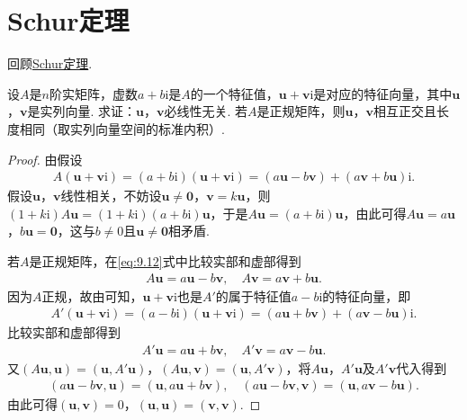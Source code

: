 \documentclass[../../main.tex]{subfiles}%
\begin{document}
\section{Schur定理}

回顾\hyperref[theorem:Schur(舒尔)定理]{Schur定理}.

\begin{proposition}\label{proposition:两个半正定阵可同时合同对角化6}
设\(A\)是\(n\)阶实矩阵，虚数\(a + b\mathrm{i}\)是\(A\)的一个特征值，\(\boldsymbol{u}+ \boldsymbol{v}\mathrm{i}\)是对应的特征向量，其中\(\boldsymbol{u}\)，\(\boldsymbol{v}\)是实列向量. 求证：\(\boldsymbol{u}\)，\(\boldsymbol{v}\)必线性无关. 若\(A\)是正规矩阵，则\(\boldsymbol{u}\)，\(\boldsymbol{v}\)相互正交且长度相同（取实列向量空间的标准内积）.
\end{proposition}
\begin{proof}
由假设
\begin{align}
A(\boldsymbol{u}+ \boldsymbol{v}\mathrm{i})=(a + b\mathrm{i})(\boldsymbol{u}+ \boldsymbol{v}\mathrm{i})=(a\boldsymbol{u}-b\boldsymbol{v})+(a\boldsymbol{v}+b\boldsymbol{u})\mathrm{i}.\label{eq:9.12}
\end{align}
假设\(\boldsymbol{u}\)，\(\boldsymbol{v}\)线性相关，不妨设\(\boldsymbol{u}\neq\boldsymbol{0}\)，\(\boldsymbol{v}=k\boldsymbol{u}\)，则\((1 + k\mathrm{i})A\boldsymbol{u}=(1 + k\mathrm{i})(a + b\mathrm{i})\boldsymbol{u}\)，于是\(A\boldsymbol{u}=(a + b\mathrm{i})\boldsymbol{u}\)，由此可得\(A\boldsymbol{u}=a\boldsymbol{u}\)，\(b\boldsymbol{u}=\boldsymbol{0}\)，这与\(b\neq0\)且\(\boldsymbol{u}\neq\boldsymbol{0}\)相矛盾.

若\(A\)是正规矩阵，在\eqref{eq:9.12}式中比较实部和虚部得到
\begin{align*}
A\boldsymbol{u}=a\boldsymbol{u}-b\boldsymbol{v},\quad A\boldsymbol{v}=a\boldsymbol{v}+b\boldsymbol{u}.
\end{align*}
因为\(A\)正规，故由可知，\(\boldsymbol{u}+ \boldsymbol{v}\mathrm{i}\)也是\(A'\)的属于特征值\(a - b\mathrm{i}\)的特征向量，即
\begin{align*}
A'(\boldsymbol{u}+ \boldsymbol{v}\mathrm{i})=(a - b\mathrm{i})(\boldsymbol{u}+ \boldsymbol{v}\mathrm{i})=(a\boldsymbol{u}+b\boldsymbol{v})+(a\boldsymbol{v}-b\boldsymbol{u})\mathrm{i}.
\end{align*}
比较实部和虚部得到
\begin{align*}
A'\boldsymbol{u}=a\boldsymbol{u}+b\boldsymbol{v},\quad A'\boldsymbol{v}=a\boldsymbol{v}-b\boldsymbol{u}.
\end{align*}
又\((A\boldsymbol{u},\boldsymbol{u})=(\boldsymbol{u},A'\boldsymbol{u})\)，\((A\boldsymbol{u},\boldsymbol{v})=(\boldsymbol{u},A'\boldsymbol{v})\)，将\(A\boldsymbol{u}\)，\(A'\boldsymbol{u}\)及\(A'\boldsymbol{v}\)代入得到
\begin{align*}
(a\boldsymbol{u}-b\boldsymbol{v},\boldsymbol{u})=(\boldsymbol{u},a\boldsymbol{u}+b\boldsymbol{v}),\quad (a\boldsymbol{u}-b\boldsymbol{v},\boldsymbol{v})=(\boldsymbol{u},a\boldsymbol{v}-b\boldsymbol{u}).
\end{align*}
由此可得\((\boldsymbol{u},\boldsymbol{v}) = 0\)，\((\boldsymbol{u},\boldsymbol{u})=(\boldsymbol{v},\boldsymbol{v})\).
\end{proof}
\end{document}
